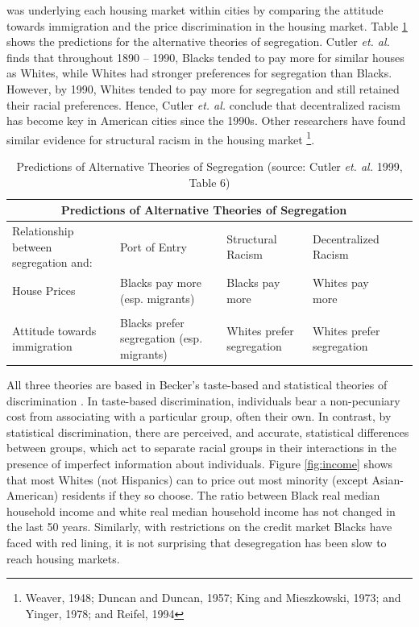 {was underlying each housing market within cities by comparing the attitude towards immigration and the price discrimination in the housing market. Table \ref{tab:cutler6} shows the predictions for the alternative theories of segregation. Cutler \textit{et. al.}  finds that throughout 1890 -- 1990, Blacks tended to pay more for similar houses as Whites, while Whites had stronger preferences for segregation than Blacks. However, by 1990, Whites tended to pay more for segregation and still retained their racial preferences. Hence, Cutler \textit{et. al.} conclude that decentralized racism has become key in American cities since the 1990s. Other researchers have found similar evidence for structural racism in the housing market \footnote{Weaver, 1948\cite{weaver48}; Duncan and Duncan, 1957\cite{duncan57}; King and Mieszkowski, 1973\cite{king73}; and Yinger, 1978\cite{yinger78}; and Reifel, 1994\cite{reifel94}}.

\begin{table}[h!]
\begin{tabular}{|p{3.5cm}||p{3.1cm}|p{3.1cm}|p{3.1cm}|p{3.1cm}}
\hline
\multicolumn{4}{|c|}{Predictions of Alternative Theories of Segregation}\\ \hline \hline
 Relationship between segregation and: & Port of Entry & Structural Racism & Decentralized Racism\\
 \hline
  House Prices & Blacks pay more (esp. migrants) & Blacks pay more & Whites pay more\\
  & & & \\
   Attitude towards immigration & Blacks prefer segregation (esp. migrants) & Whites prefer segregation & Whites prefer segregation\\
 \hline \hline
\end{tabular}
\caption[Alternative Theories of Segregation]{Predictions of Alternative Theories of Segregation (source: Cutler \textit{et. al.} 1999, Table 6)}
\label{tab:cutler6}
\end{table} 

All three theories are based in Becker's taste-based and statistical theories of discrimination \cite{becker10}. In taste-based discrimination, individuals bear a non-pecuniary cost from associating with a particular group, often their own. In contrast, by statistical discrimination, there are perceived, and accurate, statistical differences between groups, which act to separate racial groups in their interactions in the presence of imperfect information about individuals. Figure \ref{fig:income} shows that most Whites (not Hispanics) can to price out most minority (except Asian-American) residents if they so choose. The ratio between Black real median household income and white real median household income has not changed in the last 50 years. Similarly, with restrictions on the credit market Blacks have faced with red lining, it is not surprising that desegregation has been slow to reach housing markets.

}
